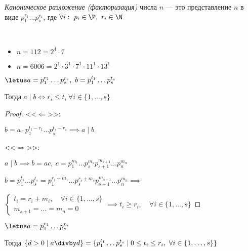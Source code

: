 \begin{defn}
    \emph{Каноническое разложение (факторизация)} числа $n$ --- это представление $n$ в виде $p_1^{r_1} \ldots p_s^{r_s}$, где $\forall i:\ p_i \in \P,~ r_i \in \N$
\end{defn}

\begin{examples}~

    \begin{itemize}
        \item $n = 112 = 2^4 \cdot 7$
        
        \item $n = 6006 = 2^1 \cdot 3^1 \cdot 7^1 \cdot 11^1 \cdot 13^1$
    \end{itemize}
\end{examples}

\begin{theorem-non}
    $\letus a = p_1^{r_1} \ldots p_s^{r_s},~ b = p_1^{t_1} \ldots p_s^{t_s}$

    Тогда $a \mid b \iff r_i \leq t_i~\forall i \in \{1, \ldots, s\}$
\end{theorem-non}

\begin{proof}
    
    <<$\Leftarrow$>>:
    
    $b = a \cdot p_1^{t_1 - r_1} \ldots p_s^{t_s - r_s} \implies a \mid b$
    
    <<$\Rightarrow$>>:
    
    $a \mid b \implies b = ac,~ c = p_1^{m_1} \ldots p_s^{m_s} p_{s+1}^{m_{s+1}} \ldots p_n^{m_n}$
    
    $b = p_1^{t_1} \ldots p_s^{t_s} = p_1^{r_1 + m_1} \ldots p_s^{r_s + m_s} p_{s+1}^{m_{s+1}} \ldots p_n^{m_n} \implies$
    
    $\begin{cases}
        t_i = r_i + m_i, \quad \forall i \in \{1, \ldots, s\}\\
         m_{s+1} = \ldots = m_n = 0 
    \end{cases} \implies t_i \geq r_i,\quad \forall i \in \{1, \ldots, s\}$
\end{proof}

\begin{follow}
    $\letus a = p_1^{r_1} \ldots p_s^{r_s}$

    Тогда $\{d > 0 \mid a \divby d\} = \{p_1^{t_1} \ldots p_s^{t_s} \mid 0 \leq t_i \leq r_i,~ \forall i \in \{1, \ldots, s\}\}$
\end{follow}

